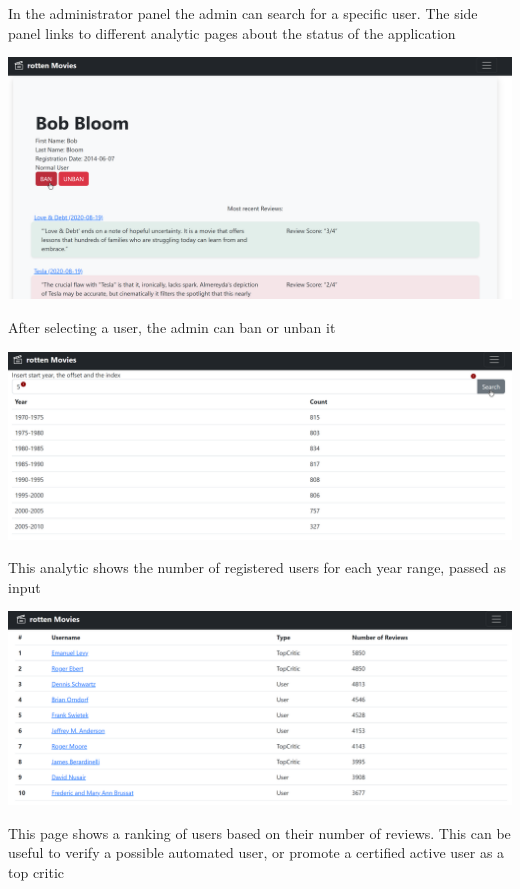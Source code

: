 In the administrator panel the admin can search for a specific user. The side panel links to different analytic pages about the status of the application

\includegraphics[scale=0.45]{../../../images/user_manual/ban_user.png} 

After selecting a user, the admin can ban or unban it

\includegraphics[scale=0.45]{../../../images/user_manual/population_by_age.png} 

This analytic shows the number of registered users for each year range, passed as input

\includegraphics[scale=0.45]{../../../images/user_manual/most_active_users.png} 

This page shows a ranking of users based on their number of reviews. This can be useful to verify a possible automated user, or promote a certified active user as a top critic

